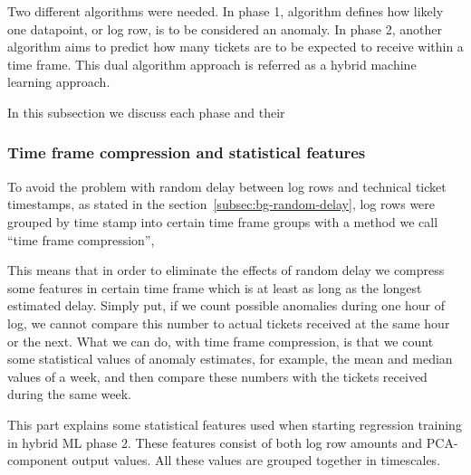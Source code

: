 Two different algorithms were needed.
In phase 1,
algorithm defines how likely one datapoint, or log row,
is to be considered an anomaly.
In phase 2,
another algorithm aims to predict
how many tickets are to be expected to receive
within a time frame.
This dual algorithm approach is referred as a hybrid machine learning approach. %

In this subsection
we discuss each phase and their %





\subsubsection*{Time frame compression and statistical features}
To avoid the problem with random delay
between log rows and technical ticket timestamps,
as stated in the section~\ref{subsec:bg-random-delay},
log rows were grouped by time stamp
into certain time frame groups %
with a method we call \enquote{time frame compression},

This means that
in order to eliminate the effects of random delay
we compress some features in certain time frame
which is at least as long as the longest estimated delay.
Simply put,
if we count possible anomalies during one hour of log,
we cannot compare this number to actual tickets received
at the same hour or the next.
What we can do,
with time frame compression,
is that we count some statistical values of anomaly estimates,
for example, the mean and median values of a week,
and then compare these numbers with the tickets received
during the same week.



\begin{itcomment}
    This part explains some statistical features used when starting regression training
    in hybrid ML phase 2.
    These features consist of both log row amounts
    and PCA-component output values.
    All these values are grouped together in timescales.
\end{itcomment}



